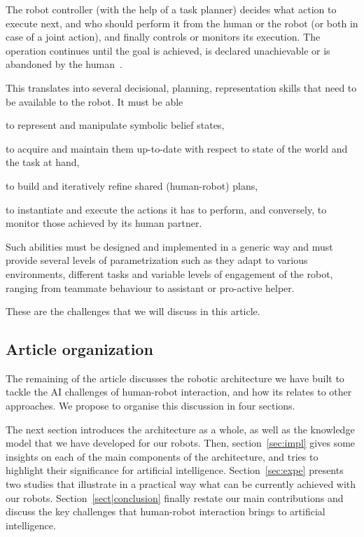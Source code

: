 \documentclass[preprint,3p,times]{elsarticle}
\begin{document}
The robot controller (with the help of a task planner) decides what action to
execute next, and who should perform it from the human or the robot (or both in
case of a joint action), and finally controls or monitors its execution. The
operation continues until the goal is achieved, is declared unachievable or is
abandoned by the human~\cite{Klein2004}.

\begin{inparaenum}

This translates into several decisional, planning, representation skills that
need to be available to the robot. It must be able \item to represent and
manipulate symbolic belief states, \item to acquire and maintain them up-to-date
with respect to state of the world and the task at hand, \item to build and
iteratively refine shared (human-robot) plans, \item to instantiate and execute
the actions it has to perform, and conversely, to monitor those achieved by
its human partner.

\end{inparaenum}

Such abilities must be designed and implemented in a generic way and
must provide several levels of parametrization such as they adapt to
various environments, different tasks and variable levels of engagement of the
robot, ranging from teammate behaviour to assistant or pro-active helper.

These are the challenges that we will discuss in this article.

\subsection{Article organization}

The remaining of the article discusses the robotic architecture we have built to
tackle the AI challenges of human-robot interaction, and how its relates to
other approaches. We propose to organise this discussion in four sections.

The next section introduces the architecture as a whole, as well as the
knowledge model that we have developed for our robots. Then,
section~\ref{sec:impl} gives some insights on each of the main components of the
architecture, and tries to highlight their significance for artificial
intelligence. Section~\ref{sec:expe} presents two studies that illustrate in a
practical way what can be currently achieved with our robots.
Section~\ref{sect|conclusion} finally restate our main contributions and discuss
the key challenges that human-robot interaction brings to artificial
intelligence.
\end{document}
